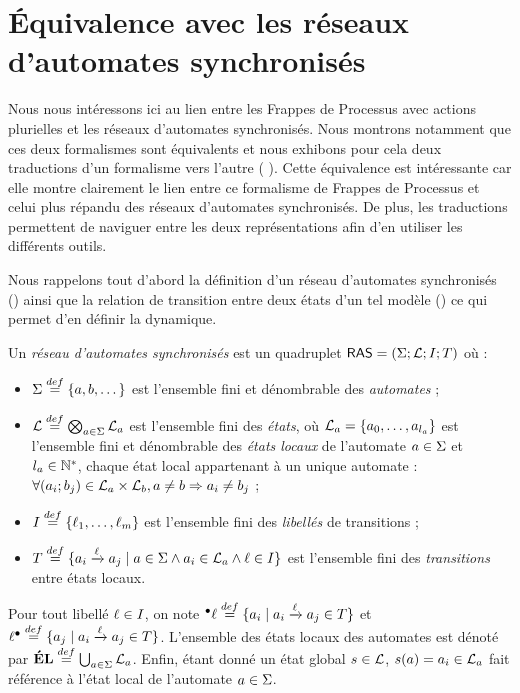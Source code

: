 
\section{Équivalence avec les réseaux d'automates synchronisés}

Nous nous intéressons ici au lien entre les Frappes de Processus avec actions plurielles
et les réseaux d'automates synchronisés.
Nous montrons notamment que ces deux formalismes sont équivalents
et nous exhibons pour cela deux traductions d'un formalisme vers l'autre
( ).
Cette équivalence est intéressante car elle montre clairement le lien entre ce formalisme
de Frappes de Processus et celui plus répandu des réseaux d'automates synchronisés.
De plus, les traductions permettent de naviguer entre les deux représentations
afin d'en utiliser les différents outils.

Nous rappelons tout d'abord la définition d'un réseau d'automates synchronisés ()
ainsi que la relation de transition entre deux états d'un tel modèle ()
ce qui permet d'en définir la dynamique.

\begin{definition}
  Un \emph{réseau d'automates synchronisés} est un quadruplet $\mathsf{RAS} = (\Sigma; \mathcal{L}; I; T)$
  où :
  \begin{itemize}
    \item $\Sigma \stackrel{def}= \{a, b, \dots\}$ est l'ensemble fini et dénombrable des \emph{automates} ;
    \item $\mathcal{L} \stackrel{def}= \bigotimes_{a \in \Sigma} \mathcal{L}_a$ est l'ensemble fini des \emph{états},
      où $\mathcal{L}_a = \{a_0, \ldots, a_{l_a}\}$ est l'ensemble fini et dénombrable
      des \emph{états locaux} de l'automate $a \in \Sigma$ et $l_a \in \mathbb{N}^*$,
      chaque état local appartenant à un unique automate :
      $\forall (a_i; b_j) \in \mathcal{L}_a \times \mathcal{L}_b, a \neq b \Rightarrow a_i \neq b_j$ ;
    \item $I \stackrel{def}= \{\ell_1, \dots, \ell_m\}$ est l'ensemble fini des
      \emph{libellés} de transitions ;
    \item $T \stackrel{def}= \{ a_i \xrightarrow{\ell} a_j \mid a \in \Sigma \wedge a_i \in \mathcal{L}_a \wedge
      \ell \in I \}$ est l'ensemble fini des \emph{transitions} entre états locaux.
  \end{itemize}
  Pour tout libellé $\ell \in I$, on note
  ${}^\bullet \ell \stackrel{def}= \{ a_i \mid a_i \xrightarrow{\ell} a_j \in T \}$
  et $\ell {}^\bullet \stackrel{def}= \{ a_j \mid a_i \xrightarrow{\ell} a_j \in T \}$.
  L'ensemble des états locaux des automates est dénoté par
  $\mathbf{\acute{E}L} \stackrel{def}= \bigcup_{a \in \Sigma} \mathcal{L}_a$.
  Enfin, étant donné un état global $s \in \mathcal{L}$, $s(a) = a_i \in \mathcal{L}_a$
  fait référence à l'état local de l'automate $a \in \Sigma$.
\end{definition}

